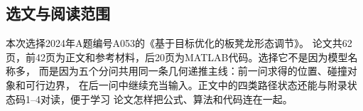 \subsection{选文与阅读范围}

本次选择2024年A题编号A053的《基于目标优化的板凳龙形态调节》\cite{A053}。
论文共62页，前42页为正文和参考材料，后20页为MATLAB代码。选择它不是因为模型名称多，
而是因为五个分问共用同一条几何递推主线：前一问求得的位置、碰撞对象和可行边界，
在后一问中继续充当输入。正文中的四类路径状态还能与附录状态码1--4对读，便于学习
论文怎样把公式、算法和代码连在一起。

